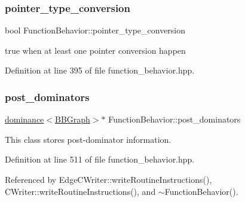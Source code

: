 \mbox{\label{classFunctionBehavior_a4c771cb0eb670e5ed967aa48cf0c9af4}} 
\subsubsection{\texorpdfstring{pointer\+\_\+type\+\_\+conversion}{pointer\_type\_conversion}}
{\footnotesize\ttfamily bool Function\+Behavior\+::pointer\+\_\+type\+\_\+conversion\hspace{0.3cm}{\ttfamily [private]}}



true when at least one pointer conversion happen 



Definition at line 395 of file function\+\_\+behavior.\+hpp.

\mbox{\label{classFunctionBehavior_aabc18a74b84928a2db6ae970bd74bda5}} 
\subsubsection{\texorpdfstring{post\+\_\+dominators}{post\_dominators}}
{\footnotesize\ttfamily \hyperlink{classdominance}{dominance}$<$\hyperlink{structBBGraph}{B\+B\+Graph}$>$$\ast$ Function\+Behavior\+::post\+\_\+dominators}



This class stores post-\/dominator information. 



Definition at line 511 of file function\+\_\+behavior.\+hpp.



Referenced by Edge\+C\+Writer\+::write\+Routine\+Instructions(), C\+Writer\+::write\+Routine\+Instructions(), and $\sim$\+Function\+Behavior().

\mbox{\label{classFunctionBehavior_a8dc371d0ec08c289ed8c6d5b5e95a13a}} 
